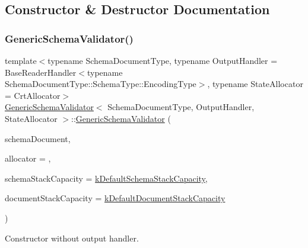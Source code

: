 \subsection{Constructor \& Destructor Documentation}
\mbox{\label{classGenericSchemaValidator_a202ee6fdbe5ae9eab3e77a81ecdfeb6d}} 
\subsubsection{\texorpdfstring{Generic\+Schema\+Validator()}{GenericSchemaValidator()}\hspace{0.1cm}{\footnotesize\ttfamily [1/3]}}
{\footnotesize\ttfamily template$<$typename Schema\+Document\+Type, typename Output\+Handler = Base\+Reader\+Handler$<$typename Schema\+Document\+Type\+::\+Schema\+Type\+::\+Encoding\+Type$>$, typename State\+Allocator = Crt\+Allocator$>$ \\
\hyperlink{classGenericSchemaValidator}{Generic\+Schema\+Validator}$<$ Schema\+Document\+Type, Output\+Handler, State\+Allocator $>$\+::\hyperlink{classGenericSchemaValidator}{Generic\+Schema\+Validator} (\begin{DoxyParamCaption}\item[{const Schema\+Document\+Type \&}]{schema\+Document,  }\item[{State\+Allocator $\ast$}]{allocator = {},  }\item[{size\+\_\+t}]{schema\+Stack\+Capacity = {\ttfamily \hyperlink{classGenericSchemaValidator_aab8510602779c91bc5b55ea81fd7385b}{k\+Default\+Schema\+Stack\+Capacity}},  }\item[{size\+\_\+t}]{document\+Stack\+Capacity = {\ttfamily \hyperlink{classGenericSchemaValidator_a0052a86778575179422064167a95c405}{k\+Default\+Document\+Stack\+Capacity}} }\end{DoxyParamCaption})\hspace{0.3cm}{\ttfamily [inline]}}



Constructor without output handler. 


